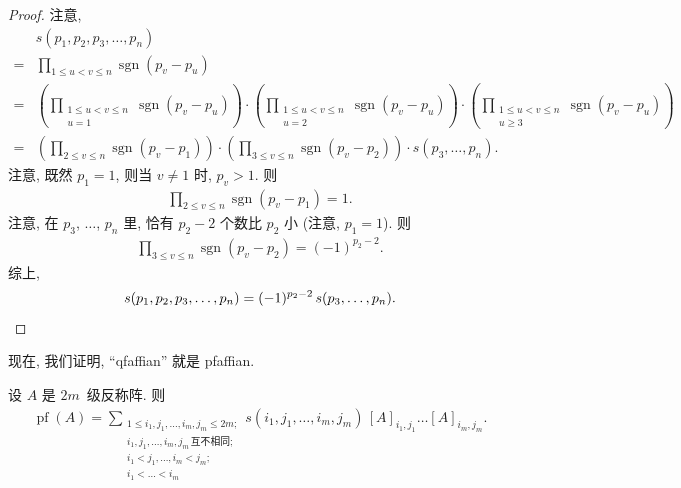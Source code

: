 \documentclass[../libro.tex]{subfiles}
\begin{document}
\begin{proof}
    注意,
    \begin{align*}
        &
        s(p_1, p_2, p_3, \dots, p_n)
        \\
        = {} &
        \prod_{1 \leq u < v \leq n}
        {\operatorname{sgn} {(p_v - p_u)}}
        \\
        = {} &
        \left(
            \prod_{\substack{1 \leq u < v \leq n \\
            u = 1}}
            {\operatorname{sgn} {(p_v - p_u)}}
        \right)
        \cdot
        \left(
            \prod_{\substack{1 \leq u < v \leq n \\
            u = 2}}
            {\operatorname{sgn} {(p_v - p_u)}}
        \right)
        \cdot
        \left(
            \prod_{\substack{1 \leq u < v \leq n \\
            u \geq 3}}
            {\operatorname{sgn} {(p_v - p_u)}}
        \right)
        \\
        = {} &
        \left(
            \prod_{2 \leq v \leq n}
            {\operatorname{sgn} {(p_v - p_1)}}
        \right)
        \cdot
        \left(
            \prod_{3 \leq v \leq n}
            {\operatorname{sgn} {(p_v - p_2)}}
        \right)
        \cdot
        s(p_3, \dots, p_n).
    \end{align*}
    注意, 既然 \(p_1 = 1\),
    则当 \(v \neq 1\) 时, \(p_v > 1\).
    则
    \begin{align*}
        \prod_{2 \leq v \leq n}
        {\operatorname{sgn} {(p_v - p_1)}}
        = 1.
    \end{align*}
    注意, 在 \(p_3\), \(\dots\), \(p_n\) 里,
    恰有 \(p_2 - 2\) 个数比 \(p_2\) 小
    (注意, \(p_1 = 1\)).
    则
    \begin{align*}
        \prod_{3 \leq v \leq n}
        {\operatorname{sgn} {(p_v - p_2)}}
        = (-1)^{p_2 - 2}.
    \end{align*}
    综上,
    \begin{equation*}
        s(p_1, p_2, p_3, \dots, p_n)
        = (-1)^{p_2 - 2}\, s(p_3, \dots, p_n).
        \qedhere
    \end{equation*}
\end{proof}

现在, 我们证明, ``qfaffian'' 就是 pfaffian.

\begin{theorem}
    设 \(A\) 是 \(2m\)~级反称阵.
    则
    \begin{align*}
        \operatorname{pf} {(A)}
        = \sum_{\substack{
                1 \leq i_1, j_1, \dots, i_m, j_m \leq 2m;   \\
                i_1, j_1, \dots, i_m, j_m\,\text{互不相同}; \\
                i_1 < j_1, \dots, i_m < j_m;                \\
                i_1 < \dots < i_m
        }}
        {s(i_1, j_1, \dots, i_m, j_m)\,
        [A]_{i_1,j_1} \dots [A]_{i_m,j_m}}.
    \end{align*}
\end{theorem}
\end{document}

